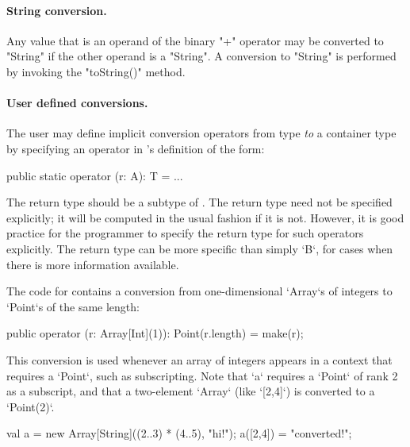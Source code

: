 
\paragraph{String conversion.}
Any value that is an operand of the binary
\xcd"+" operator may
be converted to \xcd"String" if the other operand is a \xcd"String".
A conversion to \xcd"String" is performed by invoking the \xcd"toString()"
method.


\paragraph{User defined conversions.}\label{sec:user-defined-conversions}

The user may define implicit conversion operators from type  {\em to} a
container type  by specifying an operator in 's definition of the form:

\begin{xten}
  public static operator (r: A): T = ... 
\end{xten}

The return type  should be a subtype of . The return
type need not be specified explicitly; it will be computed in the
usual fashion if it is not. However, it is good practice for the
programmer to specify the return type for such operators explicitly.
The return type can be more specific than simply \xcd`B`, for cases when there
is more information available.


\begin{ex}
The code for  contains a conversion from 
one-dimensional \xcd`Array`s of integers to \xcd`Point`s of the same length: 
\begin{xten}
  public operator (r: Array[Int](1)): Point(r.length) = make(r);
\end{xten}
This conversion is used whenever an array of integers appears in a 
context that requires a \xcd`Point`, such as subscripting. Note 
that \xcd`a` requires a \xcd`Point` of rank 2 as a subscript, and that 
a two-element \xcd`Array` (like \xcd`[2,4]`) is converted to a 
\xcd`Point(2)`.
\begin{xten}
val a = new Array[String]((2..3) * (4..5), "hi!");
a([2,4]) = "converted!";
\end{xten}


\end{ex}

